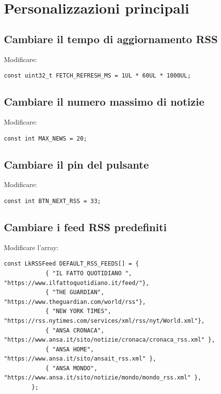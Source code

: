 \documentclass[11pt,a4paper]{article}
\begin{document}
	\section{Personalizzazioni principali}
	
	\subsection{Cambiare il tempo di aggiornamento RSS}
	
	Modificare:
	
	\begin{lstlisting}[style=codice]
		const uint32_t FETCH_REFRESH_MS = 1UL * 60UL * 1000UL;
	\end{lstlisting}
	
	\subsection{Cambiare il numero massimo di notizie}
	
	Modificare:
	
	\begin{lstlisting}[style=codice]
		const int MAX_NEWS = 20;
	\end{lstlisting}
	
	\subsection{Cambiare il pin del pulsante}
	
	Modificare:
	
	\begin{lstlisting}[style=codice]
		const int BTN_NEXT_RSS = 33;
	\end{lstlisting}
	
	\subsection{Cambiare i feed RSS predefiniti}
	
	Modificare l'array:
	
	\begin{lstlisting}[style=codice]
		const LkRSSFeed DEFAULT_RSS_FEEDS[] = {
			{ "IL FATTO QUOTIDIANO ", "https://www.ilfattoquotidiano.it/feed/"},
			{ "THE GUARDIAN", "https://www.theguardian.com/world/rss"},
			{ "NEW YORK TIMES", "https://rss.nytimes.com/services/xml/rss/nyt/World.xml"},
			{ "ANSA CRONACA", "https://www.ansa.it/sito/notizie/cronaca/cronaca_rss.xml" },
			{ "ANSA HOME",    "https://www.ansa.it/sito/ansait_rss.xml" },
			{ "ANSA MONDO",   "https://www.ansa.it/sito/notizie/mondo/mondo_rss.xml" },
		};
	\end{lstlisting}
	
\end{document}
